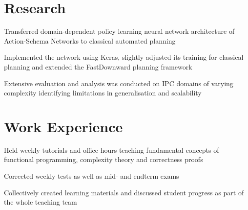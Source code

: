\documentclass[]{deedy-resume}
\begin{document}
\hfill
\begin{minipage}[t]{0.66\textwidth} 



\section{Research}
\vspace{\topsep} %
\begin{tightemize}
    \item Transferred domain-dependent policy learning neural network architecture of Action-Schema Networks to
    classical automated planning
    \item Implemented the network using Keras, slightly adjusted its training for classical planning and extended 
    the FastDownward planning framework
    \item Extensive evaluation and analysis was conducted on IPC domains of varying complexity identifying
    limitations in generalisation and scalability
\end{tightemize}
\sectionsep



\section{Work Experience}
\begin{tightemize}
    \item Held weekly tutorials and office hours teaching fundamental concepts of functional programming, complexity theory and correctness proofs
    \item Corrected weekly tests as well as mid- and endterm exams
    \item Collectively created learning materials and discussed student progress as part of the whole teaching team
\end{tightemize}
\sectionsep



\end{minipage}
\end{document}

